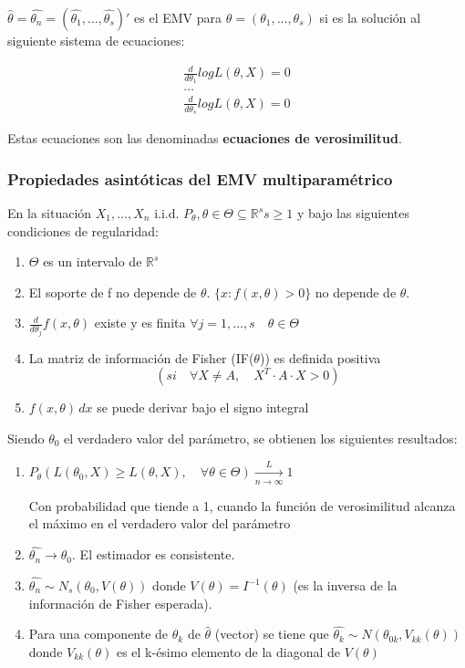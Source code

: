 $\hat{\theta}=\hat{\theta_n}=(\hat{\theta_1},\dots,\hat{\theta_s})'$ es el EMV para $\theta=(\theta_1,\dots,\theta_s)$
si es la solución al siguiente sistema de ecuaciones:

\[
\begin{matrix}
    \frac{d}{d \theta_1} log L(\theta,X)=0 \\
    \dots \\
    \frac{d}{d \theta_s} log L(\theta,X)=0
\end{matrix}
\]

Estas ecuaciones son las denominadas \textbf{ecuaciones de verosimilitud}.

\subsubsection*{Propiedades asintóticas del EMV multiparamétrico}

En la situación $X_1,\dots,X_n$ i.i.d. $P_\theta, \theta \in \Theta \subseteq \mathbb{R}^s s\geq1$
y bajo las siguientes condiciones de regularidad:

\begin{enumerate}
    \item $\Theta$ es un intervalo de $\mathbb{R}^s$
    \item El soporte de f no depende de $\theta$. $\{x:f(x,\theta)>0\}$ no depende de $\theta$.
    \item $\frac{d}{d \theta_j} f(x,\theta)$ existe y es finita $\forall j=1,\dots,s \quad \theta \in \Theta$
    \item La matriz de información de Fisher (IF($\theta$)) es definida positiva \[ (si \quad \forall X \neq A, \quad X^T \cdot A \cdot X >0) \]
    \item $f(x,\theta) \,dx$ se puede derivar bajo el signo integral
\end{enumerate}
\newpage
Siendo $\theta_0$ el verdadero valor del parámetro, se obtienen los siguientes resultados:

\begin{enumerate}
    \item $P_\theta(L(\theta_0,X)\geq L(\theta,X),\quad \forall \theta \in \Theta) \xrightarrow[n \to \infty]{L}1$
    
    Con probabilidad que tiende a 1, cuando la función de verosimilitud alcanza el máximo en el verdadero valor del parámetro
    \item $\hat{\theta_n} \to \theta_0$. El estimador es consistente.
    \item $\hat{\theta_n} \sim N_s(\theta_0,V(\theta))$ donde $V(\theta)=I^{-1}(\theta)$ (es la inversa de la información de Fisher esperada).
    \item Para una componente de $\hat{\theta_k}$ de $\hat{\theta}$ (vector) se tiene que $\hat{\theta_k} \sim N(\theta_{0k},V_{kk}(\theta))$
    donde $V_{kk}(\theta)$ es el k-ésimo elemento de la diagonal de $V(\theta)$
\end{enumerate}

